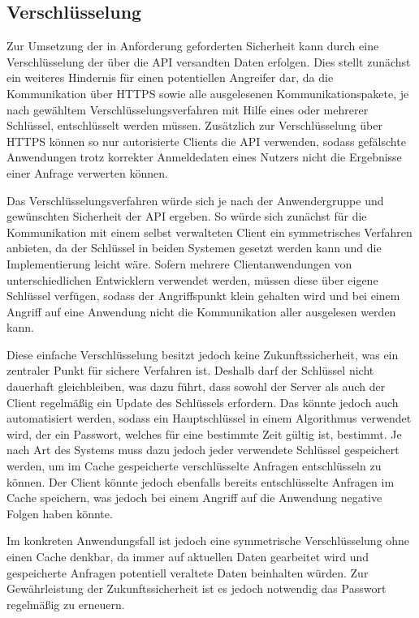 \subsection{Verschlüsselung}



Zur Umsetzung der in Anforderung 
geforderten Sicherheit kann durch eine Verschlüsselung der über die \ac{API} versandten Daten erfolgen.
Dies stellt zunächst ein weiteres Hindernis für einen potentiellen Angreifer dar, da die Kommunikation über \ac{HTTPS} sowie alle ausgelesenen Kommunikationspakete, je nach gewähltem Verschlüsselungsverfahren mit Hilfe eines oder mehrerer Schlüssel, entschlüsselt werden müssen.
Zusätzlich zur Verschlüsselung über \ac{HTTPS} können so nur autorisierte Clients die \ac{API} verwenden, sodass gefälschte Anwendungen trotz korrekter Anmeldedaten eines Nutzers nicht die Ergebnisse einer Anfrage verwerten können.

Das Verschlüsselungsverfahren würde sich je nach der Anwendergruppe und gewünschten Sicherheit der \ac{API} ergeben.
So würde sich zunächst für die Kommunikation mit einem selbst verwalteten Client ein symmetrisches Verfahren anbieten, da der Schlüssel in beiden Systemen gesetzt werden kann und die Implementierung leicht wäre.
Sofern mehrere Clientanwendungen von unterschiedlichen Entwicklern verwendet werden, müssen diese über eigene Schlüssel verfügen, sodass der Angriffspunkt klein gehalten wird und bei einem Angriff auf eine Anwendung nicht die Kommunikation aller ausgelesen werden kann.

Diese einfache Verschlüsselung besitzt jedoch keine Zukunftssicherheit, was ein zentraler Punkt für sichere Verfahren ist.
Deshalb darf der Schlüssel nicht dauerhaft gleichbleiben, was dazu führt, dass sowohl der Server als auch der Client regelmäßig ein Update des Schlüssels erfordern.
Das könnte jedoch auch automatisiert werden, sodass ein Hauptschlüssel in einem Algorithmus verwendet wird, der ein Passwort, welches für eine bestimmte Zeit gültig ist, bestimmt.
Je nach Art des Systems muss dazu jedoch jeder verwendete Schlüssel gespeichert werden, um im Cache gespeicherte verschlüsselte Anfragen entschlüsseln zu können.
Der Client könnte jedoch ebenfalls bereits entschlüsselte Anfragen im Cache speichern, was jedoch bei einem Angriff auf die Anwendung negative Folgen haben könnte.

Im konkreten Anwendungsfall ist jedoch eine symmetrische Verschlüsselung ohne einen Cache denkbar, da immer auf aktuellen Daten gearbeitet wird und gespeicherte Anfragen potentiell veraltete Daten beinhalten würden.
Zur Gewährleistung der Zukunftssicherheit ist es jedoch notwendig das Passwort regelmäßig zu erneuern.\autocite{rf-eckert2018sicherheit}
